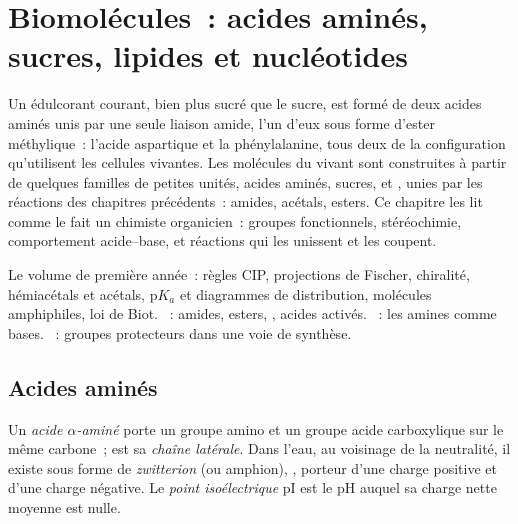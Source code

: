 \chapter{Biomolécules~: acides aminés, sucres, lipides et nucléotides}\label{ch:b2:biomolecules}

Un édulcorant courant, bien plus sucré que le sucre, est formé de deux acides aminés unis par une seule
liaison amide, l'un d'eux sous forme d'ester méthylique~: l'acide aspartique et la phénylalanine, tous
deux de la configuration qu'utilisent les cellules vivantes. Les molécules du vivant sont construites à
partir de quelques familles de petites unités, acides aminés, sucres,  et , unies
par les réactions des chapitres précédents~: amides, acétals, esters. Ce chapitre les lit comme le fait un
chimiste organicien~: groupes fonctionnels, stéréochimie, comportement acide--base, et réactions qui les
unissent et les coupent.

\begin{recall}
Le volume de première année~: règles CIP, projections de Fischer, chiralité, hémiacétals et acétals,
$\mathrm pK_a$ et diagrammes de distribution, molécules amphiphiles, loi de Biot.
~: amides, esters, , acides activés. ~:
les amines comme bases. ~: groupes protecteurs dans une voie de synthèse.
\end{recall}

\section{Acides aminés}

\begin{definition}\label{def:b2:biomolecules:amino-acid}
Un \emph{acide $\alpha$-aminé}  porte un
groupe amino et un groupe acide carboxylique sur le même carbone~;  est sa \emph{chaîne
latérale}. Dans l'eau, au voisinage de la neutralité, il existe
sous forme de \emph{zwitterion} (ou amphion),
, porteur d'une charge positive et d'une charge négative. Le \emph{point
isoélectrique} pI est le pH auquel sa charge nette moyenne est nulle.
\end{definition}

